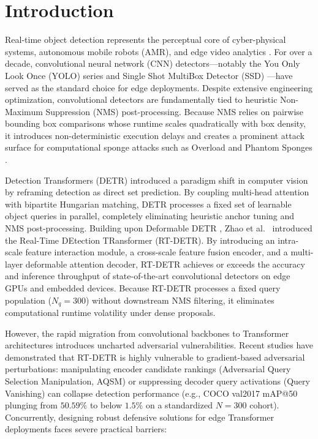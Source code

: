 \documentclass[preprint,12pt]{elsarticle}
\begin{document}
\section{Introduction}
\label{sec:introduction}

Real-time object detection represents the perceptual core of cyber-physical systems, autonomous mobile robots (AMR), and edge video analytics \citep{ren2015faster, redmon2016you}. For over a decade, convolutional neural network (CNN) detectors---notably the You Only Look Once (YOLO) series \citep{bochkovskiy2020yolov4, wang2023yolov7} and Single Shot MultiBox Detector (SSD) \citep{liu2016ssd}---have served as the standard choice for edge deployments. Despite extensive engineering optimization, convolutional detectors are fundamentally tied to heuristic Non-Maximum Suppression (NMS) post-processing. Because NMS relies on pairwise bounding box comparisons whose runtime scales quadratically with box density, it introduces non-deterministic execution delays and creates a prominent attack surface for computational sponge attacks such as Overload \citep{chen2023overload} and Phantom Sponges \citep{cina2022phantom}.

Detection Transformers (DETR) \citep{carion2020end} introduced a paradigm shift in computer vision by reframing detection as direct set prediction. By coupling multi-head attention with bipartite Hungarian matching, DETR processes a fixed set of learnable object queries in parallel, completely eliminating heuristic anchor tuning and NMS post-processing. Building upon Deformable DETR \citep{zhu2020deformable}, Zhao et al.~\citep{zhao2024detrs} introduced the Real-Time DEtection TRansformer (RT-DETR). By introducing an intra-scale feature interaction module, a cross-scale feature fusion encoder, and a multi-layer deformable attention decoder, RT-DETR achieves or exceeds the accuracy and inference throughput of state-of-the-art convolutional detectors on edge GPUs and embedded devices. Because RT-DETR processes a fixed query population ($N_q = 300$) without downstream NMS filtering, it eliminates computational runtime volatility under dense proposals.

However, the rapid migration from convolutional backbones to Transformer architectures introduces uncharted adversarial vulnerabilities. Recent studies have demonstrated that RT-DETR is highly vulnerable to gradient-based adversarial perturbations: manipulating encoder candidate rankings (Adversarial Query Selection Manipulation, AQSM) or suppressing decoder query activations (Query Vanishing) can collapse detection performance (e.g., COCO val2017 mAP@50 plunging from $50.59\%$ to below $1.5\%$ on a standardized $N=300$ cohort). Concurrently, designing robust defensive solutions for edge Transformer deployments faces severe practical barriers:
\end{document}
